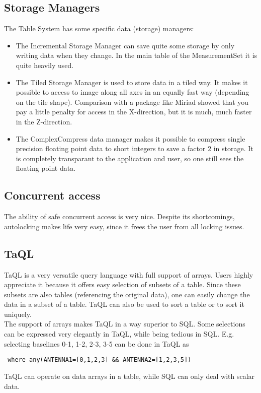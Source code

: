\subsection{Storage Managers}
The Table System has some specific data (storage) managers:
\begin{itemize}
\item
 The Incremental Storage Manager can save quite some storage by only
 writing data when they change. In the main table of the MeasurementSet
 it is quite heavily used.
\item
 The Tiled Storage Manager is used to store data in a tiled way.
 It makes it possible to access to image along all axes in an equally
 fast way (depending on the tile shape). Comparison with a package
 like Miriad showed that you pay a little penalty for access in the
 X-direction, but it is much, much faster in the Z-direction.
\item
 The ComplexCompress data manager makes it possible to compress single
 precision floating point data to short integers to save a factor 2
 in storage. It is completely transparant to the application and user,
 so one still sees the floating point data.
\end{itemize}

\subsection{Concurrent access}
The ability of safe concurrent access is very nice. Despite its
shortcomings, autolocking makes life very easy, since it frees the
user from all locking issues.

\subsection{TaQL}
TaQL is a very versatile query language with full support of arrays.
Users highly appreciate it because it offers easy selection of subsets
of a table. Since these subsets are also tables (referencing the
original data), one can easily change the data in a subset of a table.
TaQL can also be used to sort a table or to sort it uniquely.
\\The support of arrays makes TaQL in a way superior to SQL. Some
selections can be expressed very elegantly in TaQL, while being
tedious in SQL. E.g. selecting baselines 0-1, 1-2, 2-3, 3-5 can be
done in TaQL as
\begin{verbatim}
 where any(ANTENNA1=[0,1,2,3] && ANTENNA2=[1,2,3,5])
\end{verbatim}
TaQL can operate on data arrays in a table, while SQL can only
deal with scalar data.


